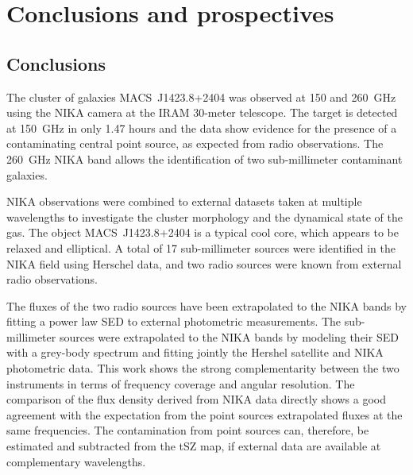 \documentclass[twocolumn,traditabstract]{aa}
\begin{document}
\section{Conclusions and prospectives}\label{sec:conclusions}
\subsection{Conclusions}
The cluster of galaxies \mbox{MACS~J1423.8+2404} was observed at 150 and 260~GHz using the NIKA camera at the IRAM 30-meter telescope. The target is detected at 150~GHz in only 1.47 hours and the data show evidence for the presence of a contaminating central point source, as expected from radio observations. The 260~GHz NIKA band allows the identification of two sub-millimeter contaminant galaxies.

NIKA observations were combined to external datasets taken at multiple wavelengths to investigate the cluster morphology and the dynamical state of the gas. The object \mbox{MACS~J1423.8+2404} is a typical cool core, which appears to be relaxed and elliptical. A total of 17 sub-millimeter sources were identified in the NIKA field using Herschel data, and two radio sources were known from external radio observations.

The fluxes of the two radio sources have been extrapolated to the NIKA bands by fitting a power law SED to external photometric measurements. The sub-millimeter sources were extrapolated to the NIKA bands by modeling their SED with a grey-body spectrum and fitting jointly the Hershel satellite and NIKA photometric data. This work shows the strong complementarity between the two instruments in terms of frequency coverage and angular resolution. The comparison of the flux density derived from NIKA data directly shows a good agreement with the expectation from the point sources extrapolated fluxes at the same frequencies. The contamination from point sources can, therefore, be estimated and subtracted from the tSZ map, if external data are available at complementary wavelengths.
\end{document}
